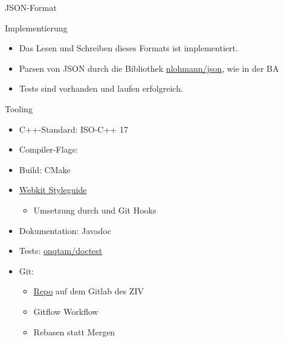 \documentclass{../presentation}
\begin{document}
\frame[plain]{\titlepage}

\begin{frame}{JSON\hyp{}Format}
    
\end{frame}

\begin{frame}{Implementierung}
    \begin{itemize}
        \item Das Lesen und Schreiben dieses Formats ist implementiert.
        \item Parsen von JSON durch die Bibliothek \href{https://github.com/nlohmann/json}
            {nlohmann/json}, wie in der BA
        \item Tests sind vorhanden und laufen erfolgreich.
    \end{itemize}
\end{frame}

\begin{frame}{Tooling}
    \begin{itemize}
        \item C++-Standard: ISO-C++ 17
        \item Compiler-Flags: 
        \item Build: CMake
        \item \href{https://webkit.org/code-style-guidelines/}{Webkit Styleguide}
            \begin{itemize}
                \item Umsetzung durch  und Git Hooks
            \end{itemize}
        \item Dokumentation: Javadoc
        \item Tests: \href{https://github.com/onqtam/doctest}{onqtam/doctest}
        \item Git:
            \begin{itemize}
                \item \href{https://zivgitlab.uni-muenster.de/b_rips01/pjs-ss20}{Repo} auf dem
                    Gitlab des ZIV
                \item Gitflow Workflow
                \item Rebasen statt Mergen
            \end{itemize}
    \end{itemize}
\end{frame}
\end{document}

